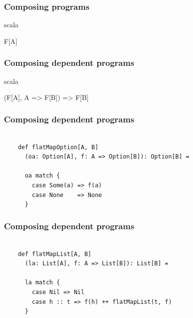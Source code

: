 \documentclass{beamer}
\begin{document}
\begin{frame}[fragile]

  \frametitle{Composing programs}

  \centering
  \Large

  \begin{cminted}{scala}

F[A]

  \end{cminted}

\end{frame}

\begin{frame}[fragile]

  \frametitle{Composing dependent programs}

  \centering
  \Large

  \begin{cminted}{scala}

(F[A], A => F[B]) => F[B]

  \end{cminted}

\end{frame}

\begin{frame}[fragile]

  \frametitle{Composing dependent programs}

  \begin{verbatim}

    def flatMapOption[A, B]
      (oa: Option[A], f: A => Option[B]): Option[B] =

      oa match {
        case Some(a) => f(a)
        case None    => None
      }

  \end{verbatim}

\end{frame}

\begin{frame}[fragile]

  \frametitle{Composing dependent programs}

  \begin{verbatim}

    def flatMapList[A, B]
      (la: List[A], f: A => List[B]): List[B] =

      la match {
        case Nil => Nil
        case h :: t => f(h) ++ flatMapList(t, f)
      }

  \end{verbatim}

\end{frame}
\end{document}
